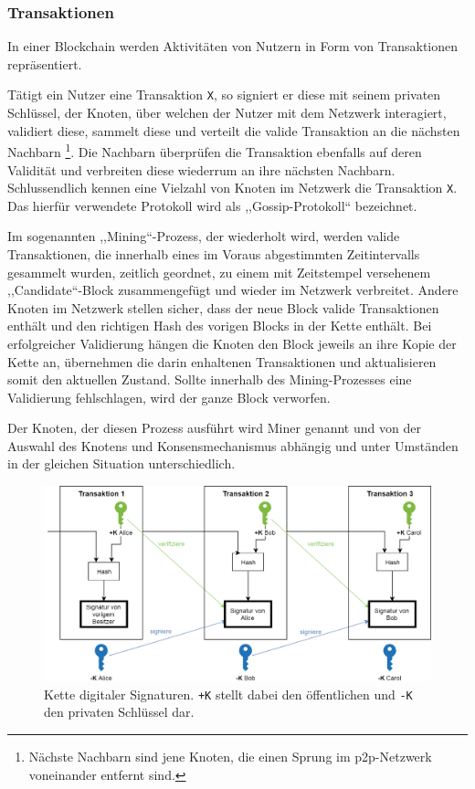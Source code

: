     \subsubsection{Transaktionen}
    \label{sec:sota_blockchain_trx}
    In einer Blockchain werden Aktivitäten von Nutzern in Form von Transaktionen repräsentiert. 
    
    Tätigt ein Nutzer eine Transaktion \lstinline{X}, so signiert er diese mit seinem privaten Schlüssel, der Knoten, über welchen der Nutzer mit dem Netzwerk interagiert, validiert diese, sammelt diese und verteilt die valide Transaktion an die nächsten Nachbarn
    \!\footnote{Nächste Nachbarn sind jene Knoten, die einen Sprung im \gls{p2p}-Netzwerk voneinander entfernt sind.}.
    Die Nachbarn überprüfen die Transaktion ebenfalls auf deren Validität und verbreiten diese wiederrum an ihre nächsten Nachbarn. 
    Schlussendlich kennen eine Vielzahl von Knoten im Netzwerk die Transaktion \lstinline{X}. 
    Das hierfür verwendete Protokoll wird als ,,Gossip-Protokoll`` bezeichnet.\cite{Christidis2016}
    
    Im sogenannten ,,Mining``-Prozess, der wiederholt wird, werden valide Transaktionen, die innerhalb eines im Voraus abgestimmten Zeitintervalls gesammelt wurden, zeitlich geordnet, zu einem mit Zeitstempel versehenem ,,Candidate``-Block zusammengefügt und wieder im Netzwerk verbreitet. 
    Andere Knoten im Netzwerk stellen sicher, dass der neue Block valide Transaktionen enthält und den richtigen Hash des vorigen Blocks in der Kette enthält. 
    Bei erfolgreicher Validierung hängen die Knoten den Block jeweils an ihre Kopie der Kette an, übernehmen die darin enhaltenen Transaktionen und aktualisieren somit den aktuellen Zustand. 
    Sollte innerhalb des Mining-Prozesses eine Validierung fehlschlagen, wird der ganze Block verworfen.\cite{Christidis2016}
    
    Der Knoten, der diesen Prozess ausführt wird Miner genannt und von der Auswahl des Knotens und Konsensmechanismus abhängig und unter Umständen in der gleichen Situation unterschiedlich.\cite{Christidis2016}
    
    \begin{figure}[H]
    	\centering
    	\includegraphics[width=\textwidth]{graphics/transaction.png}
    	\caption[Kette digitaler Signaturen]{Kette digitaler Signaturen\cite{Nakamoto2008}. \lstinline{+K} stellt dabei den öffentlichen und \lstinline{-K} den privaten Schlüssel dar.}
    	\label{fig:txio}
    \end{figure}
    
